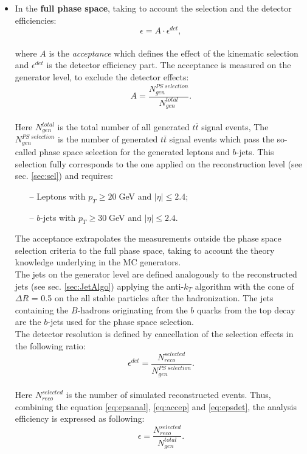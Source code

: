 \begin{itemize}
 \item In the \textbf{full phase space}, taking to account the selection and the detector efficiencies:
 \begin{equation}\label{eq:epsanal}
  \epsilon = A \cdot \epsilon^{det},
 \end{equation}
 \\
 where $A$ is the \textit{acceptance} which defines the effect of the kinematic selection and $\epsilon^{det}$ is the detector efficiency part.
 The acceptance is measured on the generator level, to exclude the detector effects:
 \\
 \begin{equation}\label{eq:accep}
  A = \frac{N^{PS\;selection}_{gen}}{N^{total}_{gen}}.
 \end{equation}
 \\
 Here $N^{total}_{gen}$ is the total number of all generated $t\bar{t}$ signal events,
 The $N_{gen}^{PS\;selection}$ is the number of generated $t\bar{t}$ signal events which pass the so-called phase space selection for the generated leptons and 
 $b$-jets. This selection fully corresponds to the one applied on the reconstruction level (see sec. \ref{sec:sel}) and requires:
 \begin{itemize}
  \item[--] Leptons with $p_{T} \geq 20\;$GeV and $|\eta| \leq 2.4$;
  \item[--] $b$-jets with $p_{T} \geq 30\;$GeV and $|\eta| \leq 2.4$.
 \end{itemize}
 The acceptance extrapolates the measurements outside the phase space selection criteria to the full phase space, taking to account the theory knowledge underlying in the MC generators.
 \\
 The jets on the generator level are defined analogously to the reconstructed jets (see sec. \ref{sec:JetAlgo}) applying the anti-$k_{T}$ algorithm with the 
 cone of $\Delta R$ = 0.5 on the all stable particles after the hadronization. The jets containing the $B$-hadrons originating from the $b$ quarks from the
 top decay are the $b$-jets used for the phase space selection.
 \\
 The detector resolution is defined by cancellation of the selection effects in the following ratio:
 \\
 \begin{equation}\label{eq:epsdet}
  \epsilon^{det} = \frac{N^{selected}_{reco}}{N^{PS\;selection}_{gen}}.
 \end{equation}
 \\
 Here $N^{selected}_{reco}$ is the number of simulated reconstructed events. Thus, combining the equation \ref{eq:epsanal}, \ref{eq:accep} and \ref{eq:epsdet},
 the analysis efficiency is expressed as following:
 \\
 \begin{equation}
  \epsilon = \frac{N^{selected}_{reco}}{N^{total}_{gen}}.
 \end{equation}
 

\end{itemize}
